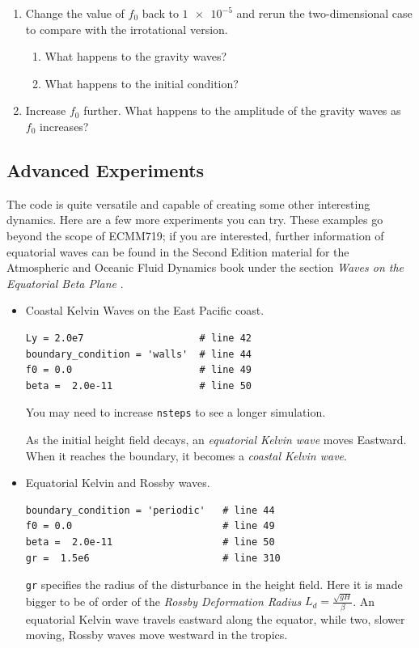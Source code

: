 \documentclass[a4paper, sfsidenotes, twoside]{tufte-handout}
\begin{document}
\begin{itemize}
\begin{enumerate}
      \item Change the value of $f_0$ back to $\num{1e-5}$ and rerun the two-dimensional case to compare with the irrotational version.
      \begin{enumerate}
        \item What happens to the gravity waves?
        \item What happens to the initial condition?
      \end{enumerate}
      \item Increase $f_0$ further.  What happens to the amplitude of the gravity waves as $f_0$ increases?
    \end{enumerate}
  \end{itemize}

\subsection{Advanced Experiments}
\label{sub:advanced}
  The code is quite versatile and capable of creating some other interesting dynamics.
  Here are a few more experiments you can try.
  These examples go beyond the scope of ECMM719; if you are interested, further information of equatorial waves can be found in the Second Edition material for the Atmospheric and Oceanic Fluid Dynamics book under the section \emph{Waves on the Equatorial Beta Plane} \cite{Vallis:2015wb}.
    \begin{itemize}
      \item Coastal Kelvin Waves on the East Pacific coast.
      \begin{verbatim}
Ly = 2.0e7                    # line 42
boundary_condition = 'walls'  # line 44
f0 = 0.0                      # line 49
beta =  2.0e-11               # line 50
      \end{verbatim}
      You may need to increase \texttt{nsteps} to see a longer simulation.

      As the initial height field decays, an \emph{equatorial Kelvin wave} moves Eastward.  When it reaches the boundary, it becomes a \emph{coastal Kelvin wave}.
    \item Equatorial Kelvin and Rossby waves.
          \begin{verbatim}
boundary_condition = 'periodic'   # line 44
f0 = 0.0                          # line 49
beta =  2.0e-11                   # line 50
gr =  1.5e6                       # line 310
          \end{verbatim}
        \texttt{gr} specifies the radius of the disturbance in the height field.
        Here it is made bigger to be of order of the \emph{Rossby Deformation Radius} $L_d = \frac{\sqrt{gH}}{\beta}$.
      An equatorial Kelvin wave travels eastward along the equator, while two, slower moving, Rossby waves move westward in the tropics.
    \end{itemize}
\end{document}
